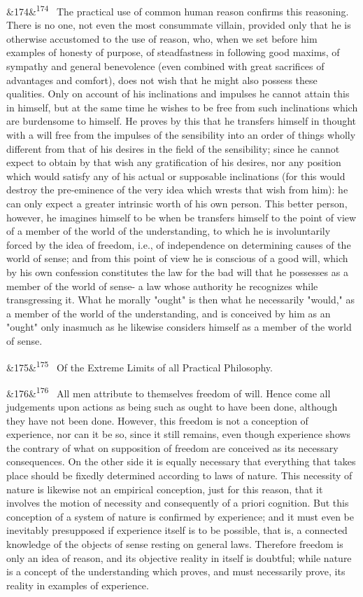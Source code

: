 \documentclass[12pt]{article}
\newcommand{\para}[1][]{\par\noindent\ifx&#1&\else\textsuperscript{\footnotesize #1}~\fi}
\begin{document}
\para[174] The practical use of common human reason confirms this reasoning. There is no one, not even the most consummate villain, provided only that he is otherwise accustomed to the use of reason, who, when we set before him examples of honesty of purpose, of steadfastness in following good maxims, of sympathy and general benevolence (even combined with great sacrifices of advantages and comfort), does not wish that he might also possess these qualities. Only on account of his inclinations and impulses he cannot attain this in himself, but at the same time he wishes to be free from such inclinations which are burdensome to himself. He proves by this that he transfers himself in thought with a will free from the impulses of the sensibility into an order of things wholly different from that of his desires in the field of the sensibility; since he cannot expect to obtain by that wish any gratification of his desires, nor any position which would satisfy any of his actual or supposable inclinations (for this would destroy the pre-eminence of the very idea which wrests that wish from him): he can only expect a greater intrinsic worth of his own person. This better person, however, he imagines himself to be when be transfers himself to the point of view of a member of the world of the understanding, to which he is involuntarily forced by the idea of freedom, i.e., of independence on determining causes of the world of sense; and from this point of view he is conscious of a good will, which by his own confession constitutes the law for the bad will that he possesses as a member of the world of sense- a law whose authority he recognizes while transgressing it. What he morally "ought" is then what he necessarily "would," as a member of the world of the understanding, and is conceived by him as an "ought" only inasmuch as he likewise considers himself as a member of the world of sense.

\para[175] Of the Extreme Limits of all Practical Philosophy.

\para[176] All men attribute to themselves freedom of will. Hence come all judgements upon actions as being such as ought to have been done, although they have not been done. However, this freedom is not a conception of experience, nor can it be so, since it still remains, even though experience shows the contrary of what on supposition of freedom are conceived as its necessary consequences. On the other side it is equally necessary that everything that takes place should be fixedly determined according to laws of nature. This necessity of nature is likewise not an empirical conception, just for this reason, that it involves the motion of necessity and consequently of a priori cognition. But this conception of a system of nature is confirmed by experience; and it must even be inevitably presupposed if experience itself is to be possible, that is, a connected knowledge of the objects of sense resting on general laws. Therefore freedom is only an idea of reason, and its objective reality in itself is doubtful; while nature is a concept of the understanding which proves, and must necessarily prove, its reality in examples of experience.
\end{document}
